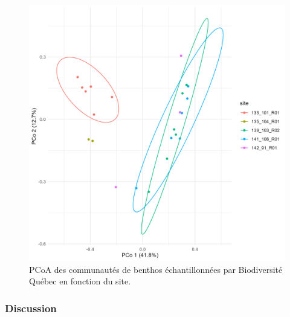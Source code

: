 \documentclass[9pt,twocolumn,twoside,]{pnas-new}
\begin{document}
\begin{figure}
\centering
\includegraphics{ordination_sites.png}
\caption{PCoA des communautés de benthos échantillonnées par
Biodiversité Québec en fonction du site. \label{fig:ordination_sites}}
\end{figure}

\hypertarget{discussion}{%
\subsubsection*{Discussion}\label{discussion}}
\end{document}
